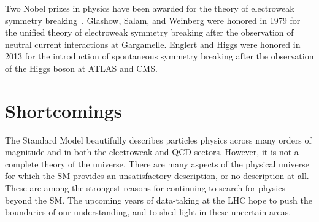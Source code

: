 Two Nobel prizes in physics have been awarded for the theory of electroweak symmetry breaking~\cite{nobelprizes}. Glashow, Salam, and Weinberg were honored in 1979 for the unified theory of electroweak symmetry breaking after the observation of neutral current interactions at Gargamelle. Englert and Higgs were honored in 2013 for the introduction of spontaneous symmetry breaking after the observation of the Higgs boson at ATLAS and CMS.

\section{Shortcomings}

The Standard Model beautifully describes particles physics across many orders of magnitude and in both the electroweak and QCD sectors. However, it is not a complete theory of the universe. There are many aspects of the physical universe for which the SM provides an unsatisfactory description, or no description at all. These are among the strongest reasons for continuing to search for physics beyond the SM. The upcoming years of data-taking at the LHC hope to push the boundaries of our understanding, and to shed light in these uncertain areas.

